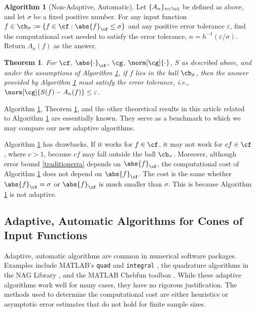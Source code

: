 \documentclass[]{elsarticle}
\newtheorem{theorem}{Theorem}
\theoremstyle{definition}
\newtheorem{algo}{Algorithm}
\theoremstyle{remark}
\newcommand{\Fnorm}[1]{\abs{#1}_{\cf}}
\newcommand{\Gnorm}[1]{\norm[\cg]{#1}}
\begin{document}
\begin{algo}[Non-Adaptive, Automatic] \label{nonadaptalgo} Let $\{A_n\}_{n \in \ci}$ be defined as above, and let $\sigma$ be a fixed positive number.  For any input function $f\in \cb_{\sigma}:=\{ f \in \cf : \Fnorm{f} \le \sigma\}$ and any positive error tolerance $\varepsilon$, find the computational cost needed to satisfy the error tolerance, $n=h^{-1}(\varepsilon/\sigma)$.  Return $A_n(f)$ as the answer.
\end{algo}

\begin{theorem}  \label{NonAdaptDetermThm}  For $\cf$, $\Fnorm{\cdot}$, $\cg$, $\Gnorm{\cdot}$, $S$ as described above, and under the assumptions of Algorithm \ref{nonadaptalgo}, if $f$ lies in the ball $\cb_\sigma$, then the answer provided by Algorithm \ref{nonadaptalgo} must satisfy the error tolerance, i.e., $\norm[\cg]{S(f)-A_n(f)} \le \varepsilon$.
\end{theorem}

Algorithm \ref{nonadaptalgo}, Theorem \ref{NonAdaptDetermThm}, and the other theoretical results in this article related to Algorithm \ref{nonadaptalgo} are essentially known.  They serve as a benchmark to which we may compare our new adaptive algorithms.  

Algorithm \ref{nonadaptalgo} has drawbacks.  If it works for $f \in \cf$, it may not work for $cf \in \cf$, where $c>1$, because $cf$ may fall outside the ball $\cb_\sigma$.  Moreover, although error bound \eqref{traditionerra} depends on $\Fnorm{f}$, the computational cost of Algorithm \ref{nonadaptalgo} does not depend on $\Fnorm{f}$.  The cost is the same whether $\Fnorm{f}=\sigma$ or $\Fnorm{f}$ is much smaller than $\sigma$.  This is because Algorithm \ref{nonadaptalgo} is not adaptive.

\subsection{Adaptive, Automatic Algorithms for Cones of Input Functions} \label{adapintrosec}

Adaptive, automatic algorithms are common in numerical software packages.  Examples include  MATLAB's {\tt quad} and {\tt integral} \cite{MAT8.1}, the quadrature algorithms in the NAG Library \cite{NAG23}, and the MATLAB Chebfun toolbox \cite{TrefEtal12}.  While these adaptive algorithms work well for many cases, they have no rigorous justification. The methods used to determine the computational cost are either heuristics or asymptotic error estimates that do not hold for finite sample sizes.
\end{document}
